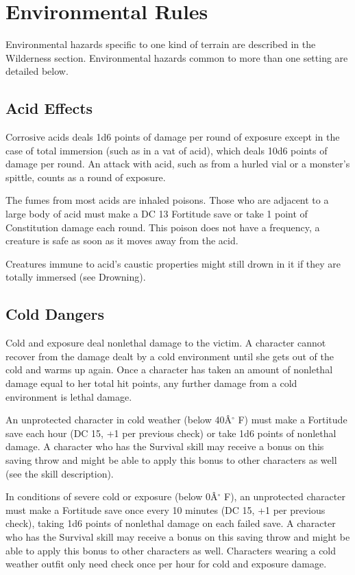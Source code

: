 \section{Environmental Rules}

				
Environmental hazards specific to one kind of terrain are described in the Wilderness section. Environmental hazards common to more than one setting are detailed below.
				
\subsection{Acid Effects}

				
Corrosive acids deals 1d6 points of damage per round of exposure except in the case of total immersion (such as in a vat of acid), which deals 10d6 points of damage per round. An attack with acid, such as from a hurled vial or a monster's spittle, counts as a round of exposure.
				
The fumes from most acids are inhaled poisons. Those who are adjacent to a large body of acid must make a DC 13 Fortitude save or take 1 point of Constitution damage each round. This poison does not have a frequency, a creature is safe as soon as it moves away from the acid.
				
Creatures immune to acid's caustic properties might still drown in it if they are totally immersed (see Drowning).
				
\subsection{Cold Dangers}

				
Cold and exposure deal nonlethal damage to the victim. A character cannot recover from the damage dealt by a cold environment until she gets out of the cold and warms up again. Once a character has taken an amount of nonlethal damage equal to her total hit points, any further damage from a cold environment is lethal damage. 
				
An unprotected character in cold weather (below 40\^A\mbox{${}^\circ$} F) must make a Fortitude save each hour (DC 15, +1 per previous check) or take 1d6 points of nonlethal damage. A character who has the Survival skill may receive a bonus on this saving throw and might be able to apply this bonus to other characters as well (see the skill description).
				
In conditions of severe cold or exposure (below 0\^A\mbox{${}^\circ$} F), an unprotected character must make a Fortitude save once every 10 minutes (DC 15, +1 per previous check), taking 1d6 points of nonlethal damage on each failed save. A character who has the Survival skill may receive a bonus on this saving throw and might be able to apply this bonus to other characters as well. Characters wearing a cold weather outfit only need check once per hour for cold and exposure damage.
				
